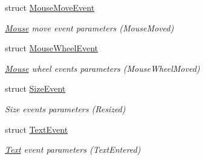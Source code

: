 \begin{DoxyCompactItemize}
struct \hyperlink{structsf_1_1Event_1_1MouseMoveEvent}{Mouse\-Move\-Event}
\begin{DoxyCompactList}\small\item\em \hyperlink{classsf_1_1Mouse}{Mouse} move event parameters (Mouse\-Moved) \end{DoxyCompactList}\item 
struct \hyperlink{structsf_1_1Event_1_1MouseWheelEvent}{Mouse\-Wheel\-Event}
\begin{DoxyCompactList}\small\item\em \hyperlink{classsf_1_1Mouse}{Mouse} wheel events parameters (Mouse\-Wheel\-Moved) \end{DoxyCompactList}\item 
struct \hyperlink{structsf_1_1Event_1_1SizeEvent}{Size\-Event}
\begin{DoxyCompactList}\small\item\em Size events parameters (Resized) \end{DoxyCompactList}\item 
struct \hyperlink{structsf_1_1Event_1_1TextEvent}{Text\-Event}
\begin{DoxyCompactList}\small\item\em \hyperlink{classsf_1_1Text}{Text} event parameters (Text\-Entered) \end{DoxyCompactList}\end{DoxyCompactItemize}
